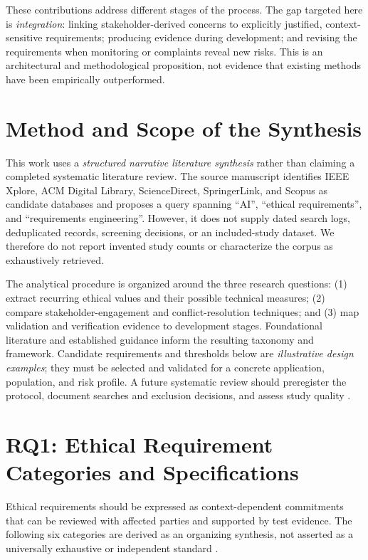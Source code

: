 \documentclass[11pt,a4paper]{article}
\begin{document}
These contributions address different stages of the process. The gap targeted here is \emph{integration}: linking stakeholder-derived concerns to explicitly justified, context-sensitive requirements; producing evidence during development; and revising the requirements when monitoring or complaints reveal new risks. This is an architectural and methodological proposition, not evidence that existing methods have been empirically outperformed.

\section{Method and Scope of the Synthesis}
This work uses a \emph{structured narrative literature synthesis} rather than claiming a completed systematic literature review. The source manuscript identifies IEEE Xplore, ACM Digital Library, ScienceDirect, SpringerLink, and Scopus as candidate databases and proposes a query spanning ``AI'', ``ethical requirements'', and ``requirements engineering''. However, it does not supply dated search logs, deduplicated records, screening decisions, or an included-study dataset. We therefore do not report invented study counts or characterize the corpus as exhaustively retrieved.

The analytical procedure is organized around the three research questions: (1) extract recurring ethical values and their possible technical measures; (2) compare stakeholder-engagement and conflict-resolution techniques; and (3) map validation and verification evidence to development stages. Foundational literature and established guidance inform the resulting taxonomy and framework. Candidate requirements and thresholds below are \emph{illustrative design examples}; they must be selected and validated for a concrete application, population, and risk profile. A future systematic review should preregister the protocol, document searches and exclusion decisions, and assess study quality \cite{kitchenham2007,braun2006}.

\section{RQ1: Ethical Requirement Categories and Specifications}
Ethical requirements should be expressed as context-dependent commitments that can be reviewed with affected parties and supported by test evidence. The following six categories are derived as an organizing synthesis, not asserted as a universally exhaustive or independent standard \cite{hleg2019,jobin2019}.
\end{document}
